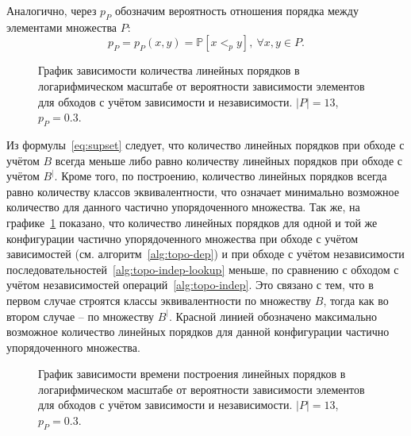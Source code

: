 Аналогично, через $p_{P}$ обозначим вероятность отношения порядка
между элементами множества $P$:
\begin{equation}
  p_{P} = p_{P}(x, y) = \mathbb{P}[x <_{p} y],\ \forall x, y \in P.
  \label{eq:prob_pos}
\end{equation}

\begin{figure}[ht]
  \centering
  \centerfloat{
    
  }
  \caption{График зависимости количества линейных порядков в
    логарифмическом масштабе от вероятности зависимости элементов для
  обходов с учётом зависимости и независимости. $|P| = 13$, $p_{P} = 0.3$.}
  \label{fig:nds-13-linext}
\end{figure}

Из формулы~\ref{eq:supset} следует, что количество линейных порядков
при обходе с учётом $B$ всегда меньше либо равно количеству линейных
порядков при обходе с учётом $B^|$. Кроме того, по построению,
количество линейных порядков всегда равно количеству классов
эквивалентности, что означает минимально возможное количество для
данного частично упорядоченного множества. Так же, на
графике~\ref{fig:nds-13-linext} показано, что количество линейных
порядков для одной и той же конфигурации частично упорядоченного
множества при обходе с учётом зависимостей (см.
алгоритм~\ref{alg:topo-dep}) и при обходе с учётом независимости
последовательностей~\ref{alg:topo-indep-lookup} меньше, по сравнению с
обходом с учётом независимостей операций~\ref{alg:topo-indep}.
Это связано с тем, что в первом случае строятся классы
эквивалентности по множеству $B$, тогда как во втором случае -- по
множеству $B^|$.
Красной линией обозначено
максимально возможное количество линейных порядков для данной
конфигурации частично упорядоченного множества.

\begin{figure}[ht]
  \centering
  \centerfloat{
    
  }
  \caption{График зависимости времени построения линейных порядков в
    логарифмическом масштабе от вероятности зависимости элементов для
  обходов с учётом зависимости и независимости. $|P| = 13$, $p_{P} = 0.3$.}
  \label{fig:nds-13-time}
\end{figure}

